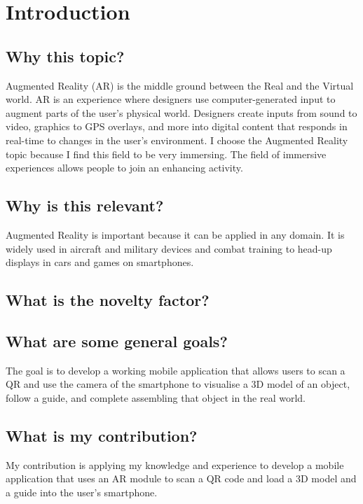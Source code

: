 \chapter{Introduction}\label{cap:introduction}

\section{Why this topic?}
Augmented Reality (AR) is the middle ground between the Real and the Virtual world.
AR is an experience where designers use computer-generated input to augment parts of the user's physical world. Designers create inputs from sound to video, graphics to GPS overlays, and more into digital content that responds in real-time to changes in the user's environment.
I choose the Augmented Reality topic because I find this field to be very immersing. The field of immersive experiences allows people to join an enhancing activity.

\section{Why is this relevant?}
Augmented Reality is important because it can be applied in any domain. It is widely used in aircraft and military devices and combat training to head-up displays in cars and games on smartphones.

\section{What is the novelty factor?}


\section{What are some general goals?}
The goal is to develop a working mobile application that allows users to scan a QR and use the camera of the smartphone to visualise a 3D model of an object, follow a guide, and complete assembling that object in the real world.

\section{What is my contribution?}
My contribution is applying my knowledge and experience to develop a mobile application that uses an AR module to scan a QR code and load a 3D model and a guide into the user's smartphone.



